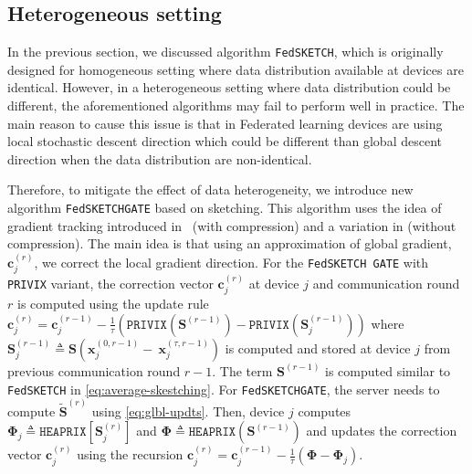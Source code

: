 \documentclass{article}
\begin{document}
\subsection{Heterogeneous setting}
In the previous section, we discussed algorithm \texttt{FedSKETCH}, which is originally designed for homogeneous setting where data distribution available at devices are identical. However, in a heterogeneous setting where data distribution could be different, the aforementioned algorithms may fail to perform well in practice. The main reason to cause this issue is that in Federated learning devices are using local stochastic descent direction which could be different than global descent direction when the data distribution are non-identical. 

Therefore, to mitigate the effect of data heterogeneity, we introduce new algorithm \texttt{FedSKETCHGATE} based on sketching. This algorithm uses the idea of gradient tracking introduced in~\cite{haddadpour2020federated} (with compression) and a variation in \cite{liang2019variance} (without compression). The main idea is that using an approximation of global gradient, $\mathbf{c}_j^{(r)}$, we correct the local gradient direction. For the \texttt{FedSKETCH GATE} with \texttt{PRIVIX} variant, the correction vector $\mathbf{c}_j^{(r)}$ at device $j$ and communication round $r$ is computed using the update rule $\mathbf{c}_j^{(r)}=\mathbf{c}_j^{(r-1)}-\frac{1}{\tau}\left({\texttt{PRIVIX}}\left(\mathbf{S}^{(r-1)}\right)-{\texttt{PRIVIX}}\left(\mathbf{S}^{(r-1)}_{j}\right)\right)$ where $\mathbf{S}^{(r-1)}_{j}\triangleq\mathbf{S}\left(\boldsymbol{x}_j^{(0,r-1)}-~{\boldsymbol{x}}_{j}^{(\tau,r-1)}\right)$ is computed and stored at device $j$ from previous communication round $r-1$. The term $\mathbf{S}^{(r-1)}$ is computed similar to \texttt{FedSKETCH} in \eqref{eq:average-skestching}. 
For \texttt{FedSKETCHGATE}, the server needs to compute $\tilde{\mathbf{S}}^{(r)}$ using \eqref{eq:glbl-updts}. 
Then, device $j$ computes $\mathbf{\Phi}_j\triangleq \texttt{HEAPRIX}[\mathbf{S}_j^{(r)}]$ and $  {\mathbf{\Phi}}\triangleq \texttt{HEAPRIX}(\mathbf{S}^{(r-1)})$ and updates the correction vector $\mathbf{c}_j^{(r)}$ using the recursion $\mathbf{c}_j^{(r)}=\mathbf{c}_j^{(r-1)}-\frac{1}{\tau}\left(\mathbf{\Phi}-\mathbf{\Phi}_j\right)$.
\end{document}
